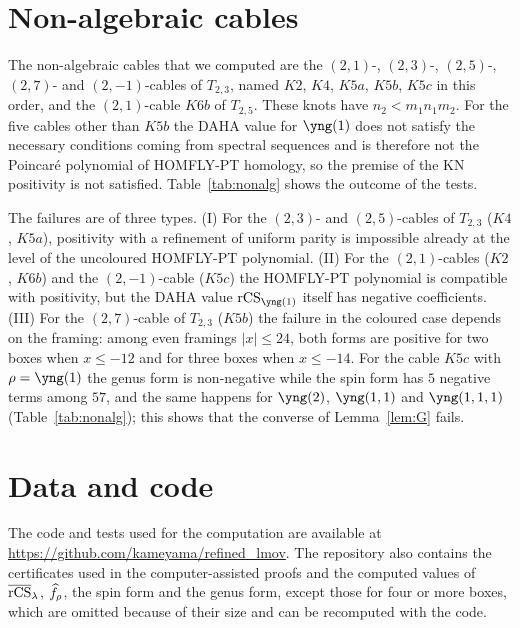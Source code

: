 \section{Non-algebraic cables}\label{app:nonalg}
The non-algebraic cables that we computed are the $(2,1)$-, $(2,3)$-, $(2,5)$-, $(2,7)$- and $(2,-1)$-cables of $T_{2,3}$, named $K2$, $K4$, $K5a$, $K5b$, $K5c$ in this order,
and the $(2,1)$-cable $K6b$ of $T_{2,5}$.
These knots have $n_2<m_1n_1m_2$. For the five cables other than $K5b$ the DAHA value for $\yng(1)$ does not satisfy the necessary conditions coming from spectral sequences and is therefore not the Poincar\'e polynomial of HOMFLY-PT homology,
so the premise of the KN positivity is not satisfied. Table~\ref{tab:nonalg} shows the outcome of the tests.
\begin{table}[h]
\centering
\caption{Non-algebraic cables at framing zero. Each entry reads ``negative terms/terms of the spin form; negative terms/terms of the genus form'', with the better overall sign in each case.}\label{tab:nonalg}
\sbox\tabbox{}\resizebox{\textwidth}{!}{\usebox\tabbox}
\end{table}
The failures are of three types.
(I) For the $(2,3)$- and $(2,5)$-cables of $T_{2,3}$ ($K4$, $K5a$), positivity with a refinement of uniform parity is impossible already at the level of the uncoloured HOMFLY-PT polynomial.
(II) For the $(2,1)$-cables ($K2$, $K6b$) and the $(2,-1)$-cable ($K5c$) the HOMFLY-PT polynomial is compatible with positivity, but the DAHA value $\rCS_{\yng(1)}$ itself has negative coefficients.
(III) For the $(2,7)$-cable of $T_{2,3}$ ($K5b$) the failure in the coloured case depends on the framing:
among even framings $|x|\le24$, both forms are positive for two boxes when $x\le-12$ and for three boxes when $x\le-14$.
For the cable $K5c$ with $\rho=\yng(1)$ the genus form is non-negative while the spin form has $5$ negative terms among $57$, and the same happens for $\yng(2)$, $\yng(1,1)$ and $\yng(1,1,1)$ (Table~\ref{tab:nonalg}); this shows that the converse of Lemma~\ref{lem:G} fails.

\section{Data and code}\label{app:data}
The code and tests used for the computation are available at \url{https://github.com/kameyama/refined_lmov}.
The repository also contains the certificates used in the computer-assisted proofs and the computed values of $\overline{\mathrm{rCS}}_\lambda$, $\widehat{f}_\rho$, the spin form and the genus form,
except those for four or more boxes, which are omitted because of their size and can be recomputed with the code.
